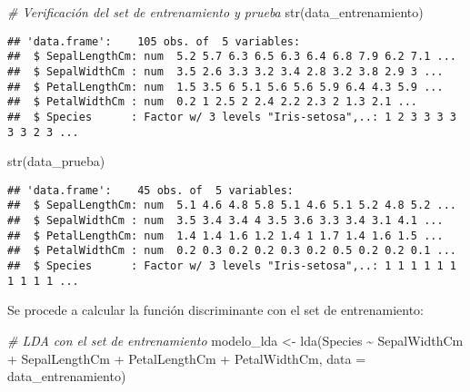 \documentclass[
]{article}
\newenvironment{Shaded}{\begin{snugshade}}{\end{snugshade}}
\newcommand{\AttributeTok}[1]{\textcolor[rgb]{0.77,0.63,0.00}{#1}}
\newcommand{\CommentTok}[1]{\textcolor[rgb]{0.56,0.35,0.01}{\textit{#1}}}
\newcommand{\FunctionTok}[1]{\textcolor[rgb]{0.00,0.00,0.00}{#1}}
\newcommand{\NormalTok}[1]{#1}
\newcommand{\OtherTok}[1]{\textcolor[rgb]{0.56,0.35,0.01}{#1}}
\newcommand{\SpecialCharTok}[1]{\textcolor[rgb]{0.00,0.00,0.00}{#1}}
\begin{document}
\begin{Shaded}
\begin{Highlighting}[]
\CommentTok{\# Verificación del set de entrenamiento y prueba}
\FunctionTok{str}\NormalTok{(data\_entrenamiento)}
\end{Highlighting}
\end{Shaded}

\begin{verbatim}
## 'data.frame':    105 obs. of  5 variables:
##  $ SepalLengthCm: num  5.2 5.7 6.3 6.5 6.3 6.4 6.8 7.9 6.2 7.1 ...
##  $ SepalWidthCm : num  3.5 2.6 3.3 3.2 3.4 2.8 3.2 3.8 2.9 3 ...
##  $ PetalLengthCm: num  1.5 3.5 6 5.1 5.6 5.6 5.9 6.4 4.3 5.9 ...
##  $ PetalWidthCm : num  0.2 1 2.5 2 2.4 2.2 2.3 2 1.3 2.1 ...
##  $ Species      : Factor w/ 3 levels "Iris-setosa",..: 1 2 3 3 3 3 3 3 2 3 ...
\end{verbatim}

\begin{Shaded}
\begin{Highlighting}[]
\FunctionTok{str}\NormalTok{(data\_prueba)}
\end{Highlighting}
\end{Shaded}

\begin{verbatim}
## 'data.frame':    45 obs. of  5 variables:
##  $ SepalLengthCm: num  5.1 4.6 4.8 5.8 5.1 4.6 5.1 5.2 4.8 5.2 ...
##  $ SepalWidthCm : num  3.5 3.4 3.4 4 3.5 3.6 3.3 3.4 3.1 4.1 ...
##  $ PetalLengthCm: num  1.4 1.4 1.6 1.2 1.4 1 1.7 1.4 1.6 1.5 ...
##  $ PetalWidthCm : num  0.2 0.3 0.2 0.2 0.3 0.2 0.5 0.2 0.2 0.1 ...
##  $ Species      : Factor w/ 3 levels "Iris-setosa",..: 1 1 1 1 1 1 1 1 1 1 ...
\end{verbatim}

Se procede a calcular la función discriminante con el set de
entrenamiento:

\begin{Shaded}
\begin{Highlighting}[]
\CommentTok{\# LDA con el set de entrenamiento}
\NormalTok{modelo\_lda }\OtherTok{\textless{}{-}} \FunctionTok{lda}\NormalTok{(Species }\SpecialCharTok{\textasciitilde{}}\NormalTok{ SepalWidthCm }\SpecialCharTok{+}\NormalTok{ SepalLengthCm }\SpecialCharTok{+}\NormalTok{ PetalLengthCm }\SpecialCharTok{+}
\NormalTok{                    PetalWidthCm, }\AttributeTok{data =}\NormalTok{ data\_entrenamiento)}
\end{Highlighting}
\end{Shaded}
\end{document}

